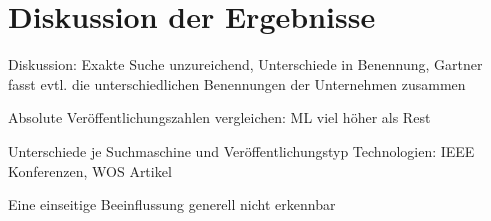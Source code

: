 \section{Diskussion der Ergebnisse}
Diskussion:
Exakte Suche unzureichend, Unterschiede in Benennung, Gartner fasst evtl. die unterschiedlichen Benennungen der Unternehmen zusammen

Absolute Veröffentlichungszahlen vergleichen: ML viel höher als Rest


Unterschiede je Suchmaschine und Veröffentlichungstyp
Technologien: IEEE Konferenzen, WOS Artikel

Eine einseitige Beeinflussung generell nicht erkennbar